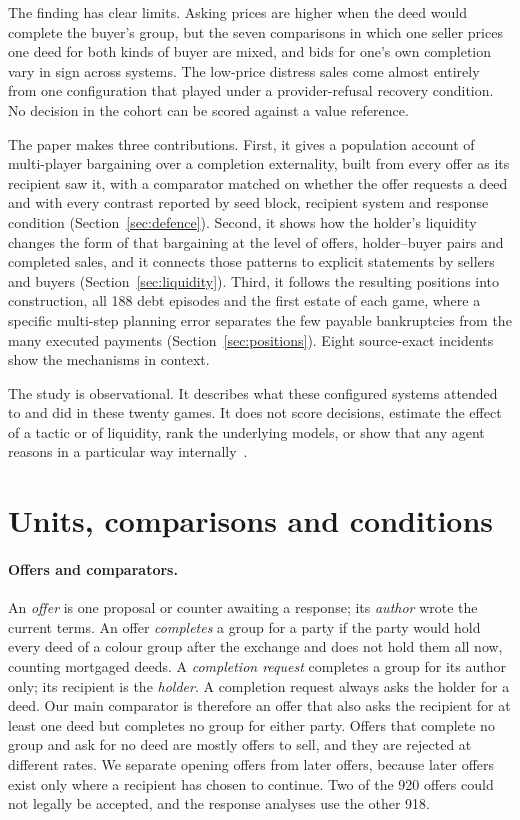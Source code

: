 \documentclass[11pt,letterpaper]{article}
\begin{document}
The finding has clear limits. Asking prices are higher when the deed would complete the buyer's group, but the seven comparisons in which one seller prices one deed for both kinds of buyer are mixed, and bids for one's own completion vary in sign across systems. The low-price distress sales come almost entirely from one configuration that played under a provider-refusal recovery condition. No decision in the cohort can be scored against a value reference.

The paper makes three contributions. First, it gives a population account of multi-player bargaining over a completion externality, built from every offer as its recipient saw it, with a comparator matched on whether the offer requests a deed and with every contrast reported by seed block, recipient system and response condition (Section~\ref{sec:defence}). Second, it shows how the holder's liquidity changes the form of that bargaining at the level of offers, holder--buyer pairs and completed sales, and it connects those patterns to explicit statements by sellers and buyers (Section~\ref{sec:liquidity}). Third, it follows the resulting positions into construction, all 188 debt episodes and the first estate of each game, where a specific multi-step planning error separates the few payable bankruptcies from the many executed payments (Section~\ref{sec:positions}). Eight source-exact incidents show the mechanisms in context.

The study is observational. It describes what these configured systems attended to and did in these twenty games. It does not score decisions, estimate the effect of a tactic or of liquidity, rank the underlying models, or show that any agent reasons in a particular way internally~\citep{turpin2023unfaithful}.

\section{Units, comparisons and conditions}
\label{sec:units}

\paragraph{Offers and comparators.} An \emph{offer} is one proposal or counter awaiting a response; its \emph{author} wrote the current terms. An offer \emph{completes} a group for a party if the party would hold every deed of a colour group after the exchange and does not hold them all now, counting mortgaged deeds. A \emph{completion request} completes a group for its author only; its recipient is the \emph{holder}. A completion request always asks the holder for a deed. Our main comparator is therefore an offer that also asks the recipient for at least one deed but completes no group for either party. Offers that complete no group and ask for no deed are mostly offers to sell, and they are rejected at different rates. We separate opening offers from later offers, because later offers exist only where a recipient has chosen to continue. Two of the 920 offers could not legally be accepted, and the response analyses use the other 918.
\end{document}
